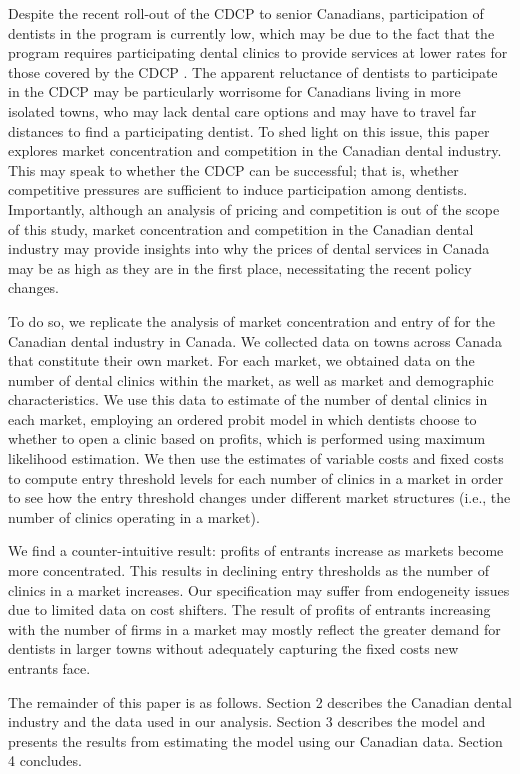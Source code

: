 \documentclass[a4paper,11pt]{article}
\begin{document}
Despite the recent roll-out of the CDCP to senior Canadians, participation of dentists in the program is currently low, which may be due to the fact that the program requires participating dental clinics to provide services at lower rates for those covered by the CDCP \citep{vonStackelberg}. The apparent reluctance of dentists to participate in the CDCP may be particularly worrisome for Canadians living in more isolated towns, who may lack dental care options and may have to travel far distances to find a participating dentist. To shed light on this issue, this paper explores market concentration and competition in the Canadian dental industry. This may speak to whether the CDCP can be successful; that is, whether competitive pressures are sufficient to induce participation among dentists. Importantly, although an analysis of pricing and competition is out of the scope of this study, market concentration and competition in the Canadian dental industry may provide insights into why the prices of dental services in Canada may be as high as they are in the first place, necessitating the recent policy changes.

To do so, we replicate the analysis of market concentration and entry of \citet{BresReiss} for the Canadian dental industry in Canada. We collected data on towns across Canada that constitute their own market. For each market, we obtained data on the number of dental clinics within the market, as well as market and demographic characteristics. We use this data to estimate of the number of dental clinics in each market, employing an ordered probit model in which dentists choose to whether to open a clinic based on profits, which is performed using maximum likelihood estimation. We then use the estimates of variable costs and fixed costs to compute entry threshold levels for each number of clinics in a market in order to see how the entry threshold changes under different market structures (i.e., the number of clinics operating in a market).

We find a counter-intuitive result: profits of entrants increase as markets become more concentrated. This results in declining entry thresholds as the number of clinics in a market increases. Our specification may suffer from endogeneity issues due to limited data on cost shifters. The result of profits of entrants increasing with the number of firms in a market may mostly reflect the greater demand for dentists in larger towns without adequately capturing the fixed costs new entrants face.

The remainder of this paper is as follows. Section 2 describes the Canadian dental industry and the data used in our analysis. Section 3 describes the model and presents the results from estimating the model using our Canadian data. Section 4 concludes.
\end{document}
